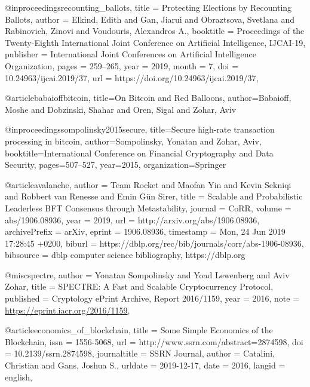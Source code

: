 @inproceedings{recounting_ballots,
  title     = {Protecting Elections by Recounting Ballots},
  author    = {Elkind, Edith and Gan, Jiarui and Obraztsova, Svetlana and Rabinovich, Zinovi and Voudouris, Alexandros A.},
  booktitle = {Proceedings of the Twenty-Eighth International Joint Conference on
               Artificial Intelligence, {IJCAI-19}},
  publisher = {International Joint Conferences on Artificial Intelligence Organization},             
  pages     = {259--265},
  year      = {2019},
  month     = {7},
  doi       = {10.24963/ijcai.2019/37},
  url       = {https://doi.org/10.24963/ijcai.2019/37},
}

@article{babaioffbitcoin,
  title={On Bitcoin and Red Balloons},
  author={Babaioff, Moshe and Dobzinski, Shahar and Oren, Sigal and Zohar, Aviv}
}

@inproceedings{sompolinsky2015secure,
  title={Secure high-rate transaction processing in bitcoin},
  author={Sompolinsky, Yonatan and Zohar, Aviv},
  booktitle={International Conference on Financial Cryptography and Data Security},
  pages={507--527},
  year={2015},
  organization={Springer}
}

@article{avalanche,
  author    = {Team Rocket and
               Maofan Yin and
               Kevin Sekniqi and
               Robbert van Renesse and
               Emin G{\"{u}}n Sirer},
  title     = {Scalable and Probabilistic Leaderless {BFT} Consensus through Metastability},
  journal   = {CoRR},
  volume    = {abs/1906.08936},
  year      = {2019},
  url       = {http://arxiv.org/abs/1906.08936},
  archivePrefix = {arXiv},
  eprint    = {1906.08936},
  timestamp = {Mon, 24 Jun 2019 17:28:45 +0200},
  biburl    = {https://dblp.org/rec/bib/journals/corr/abs-1906-08936},
  bibsource = {dblp computer science bibliography, https://dblp.org}
}

@misc{spectre,
    author = {Yonatan Sompolinsky and Yoad Lewenberg and Aviv Zohar},
    title = {SPECTRE: A Fast and Scalable Cryptocurrency Protocol},
    published = {Cryptology ePrint Archive, Report 2016/1159},
    year = {2016},
    note = {\url{https://eprint.iacr.org/2016/1159}},
}

@article{economics_of_blockchain,
	title = {Some Simple Economics of the Blockchain},
	issn = {1556-5068},
	url = {http://www.ssrn.com/abstract=2874598},
	doi = {10.2139/ssrn.2874598},
	journaltitle = {{SSRN} Journal},
	author = {Catalini, Christian and Gans, Joshua S.},
	urldate = {2019-12-17},
	date = {2016},
	langid = {english},
}
